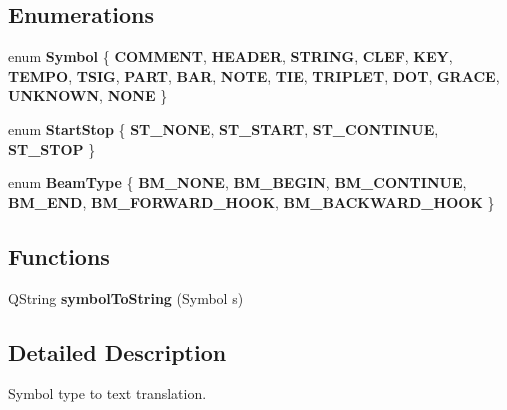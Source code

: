 \subsection*{Enumerations}
\begin{DoxyCompactItemize}
\item 
\mbox{\label{namespace_bww_a3e78f1ce9898d7fcb3f7e7adfec046f1}} 
enum {\bfseries Symbol} \{ \newline
{\bfseries C\+O\+M\+M\+E\+NT}, 
{\bfseries H\+E\+A\+D\+ER}, 
{\bfseries S\+T\+R\+I\+NG}, 
{\bfseries C\+L\+EF}, 
\newline
{\bfseries K\+EY}, 
{\bfseries T\+E\+M\+PO}, 
{\bfseries T\+S\+IG}, 
{\bfseries P\+A\+RT}, 
\newline
{\bfseries B\+AR}, 
{\bfseries N\+O\+TE}, 
{\bfseries T\+IE}, 
{\bfseries T\+R\+I\+P\+L\+ET}, 
\newline
{\bfseries D\+OT}, 
{\bfseries G\+R\+A\+CE}, 
{\bfseries U\+N\+K\+N\+O\+WN}, 
{\bfseries N\+O\+NE}
 \}
\item 
\mbox{\label{namespace_bww_a3ddfa45d84fdb77807c9e717ef29d682}} 
enum {\bfseries Start\+Stop} \{ {\bfseries S\+T\+\_\+\+N\+O\+NE}, 
{\bfseries S\+T\+\_\+\+S\+T\+A\+RT}, 
{\bfseries S\+T\+\_\+\+C\+O\+N\+T\+I\+N\+UE}, 
{\bfseries S\+T\+\_\+\+S\+T\+OP}
 \}
\item 
\mbox{\label{namespace_bww_ad6eecb9e06cc059ec569d07c325989fc}} 
enum {\bfseries Beam\+Type} \{ \newline
{\bfseries B\+M\+\_\+\+N\+O\+NE}, 
{\bfseries B\+M\+\_\+\+B\+E\+G\+IN}, 
{\bfseries B\+M\+\_\+\+C\+O\+N\+T\+I\+N\+UE}, 
{\bfseries B\+M\+\_\+\+E\+ND}, 
\newline
{\bfseries B\+M\+\_\+\+F\+O\+R\+W\+A\+R\+D\+\_\+\+H\+O\+OK}, 
{\bfseries B\+M\+\_\+\+B\+A\+C\+K\+W\+A\+R\+D\+\_\+\+H\+O\+OK}
 \}
\end{DoxyCompactItemize}
\subsection*{Functions}
\begin{DoxyCompactItemize}
\item 
\mbox{\label{namespace_bww_afe32556fd8e7fd1b3ab15a37bb3588e2}} 
Q\+String {\bfseries symbol\+To\+String} (Symbol s)
\end{DoxyCompactItemize}


\subsection{Detailed Description}
Symbol type to text translation. 